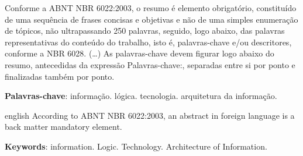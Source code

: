 \documentclass[
article,			%
11pt,				%
twoside,			%
a4paper,			%
section=TITLE,		%
onecolumn,          %
english,			%
brazil,				%
sumario=tradicional
]{abntex2}
\begin{document}
    
    
    \begin{resumo}
        Conforme a ABNT NBR 6022:2003, o resumo é elemento obrigatório, constituído de uma sequência de frases concisas e objetivas e não de uma simples enumeração de tópicos, não ultrapassando 250 palavras, seguido, logo abaixo, das palavras representativas do conteúdo do trabalho, isto é, palavras-chave e/ou descritores, conforme a NBR 6028. (\ldots) As palavras-chave devem figurar logo abaixo do resumo, antecedidas da expressão Palavras-chave:, separadas entre si por ponto e finalizadas também por ponto.
        \noindent
        
        \textbf{Palavras-chave}: informação. lógica. tecnologia. arquitetura da informação.
    \end{resumo}
        
    \renewcommand{\resumoname}{Abstract}
    \begin{resumo}
        \begin{otherlanguage*}{english}
            According to ABNT NBR 6022:2003, an abstract in foreign language is a back
            matter mandatory element.
            
            \noindent
            \textbf{Keywords}: information. Logic. Technology. Architecture of Information.
        \end{otherlanguage*}  
    \end{resumo}
    
    
    \vspace{\onelineskip}%
    
    
    
    \textual
    
\end{document}
